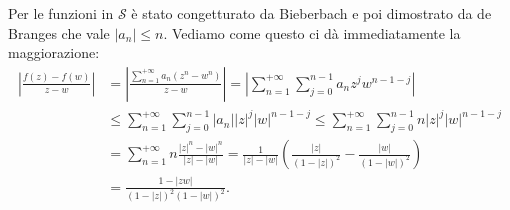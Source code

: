 Per le funzioni in $\mathcal{S}$ è stato congetturato da Bieberbach \cite{B} e poi dimostrato da de Branges \cite{dB} che vale $|a_n| \le n$. Vediamo come questo ci dà immediatamente la maggiorazione:
\begin{align*}
  \left|\frac{f(z)-f(w)}{z-w}\right|&=\left|\frac{\sum_{n=1}^{+\infty}a_n(z^n-w^n)}{z-w}\right|=\left|\sum_{n=1}^{+\infty}\sum_{j=0}^{n-1}a_nz^jw^{n-1-j}\right| \\
  &\le \sum_{n=1}^{+\infty}\sum_{j=0}^{n-1}|a_n||z|^j|w|^{n-1-j} \le \sum_{n=1}^{+\infty}\sum_{j=0}^{n-1}n|z|^j|w|^{n-1-j} \\
  &=\sum_{n=1}^{+\infty}n \frac{|z|^n-|w|^n}{|z|-|w|}=\frac{1}{|z|-|w|}\left(\frac{|z|}{(1-|z|)^2}-\frac{|w|}{(1-|w|)^2}\right) \\
  &=\frac{1-|zw|}{(1-|z|)^2(1-|w|)^2}.
\end{align*}
